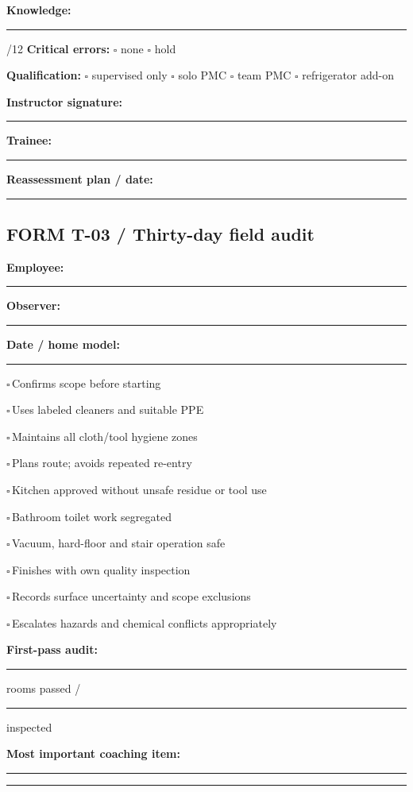 \documentclass[10pt,letterpaper,oneside]{article}
\newcommand{\tick}{\ensuremath{\square}\,}
\newcommand{\task}[1]{\par\noindent\tick #1\par}
\begin{document}
\textbf{Knowledge:} \rule{.7in}{.3pt}/12 \qquad \textbf{Critical errors:} \(\square\) none \(\square\) hold\par
\textbf{Qualification:} \(\square\) supervised only \(\square\) solo PMC \(\square\) team PMC \(\square\) refrigerator add-on\par\vspace{12pt}
\textbf{Instructor signature:} \rule{2.1in}{.3pt} \quad \textbf{Trainee:} \rule{1.5in}{.3pt}
\par\vspace{12pt}\textbf{Reassessment plan / date:}\par\rule{\linewidth}{.3pt}
\newpage\subsection*{FORM T-03 / Thirty-day field audit}
\textbf{Employee:} \rule{2.2in}{.3pt} \quad \textbf{Observer:} \rule{2in}{.3pt}\par
\textbf{Date / home model:} \rule{4.2in}{.3pt}
\begin{plainbox}
\task{Confirms scope before starting}
\task{Uses labeled cleaners and suitable PPE}
\task{Maintains all cloth/tool hygiene zones}
\task{Plans route; avoids repeated re-entry}
\task{Kitchen approved without unsafe residue or tool use}
\task{Bathroom toilet work segregated}
\task{Vacuum, hard-floor and stair operation safe}
\task{Finishes with own quality inspection}
\task{Records surface uncertainty and scope exclusions}
\task{Escalates hazards and chemical conflicts appropriately}
\end{plainbox}
\textbf{First-pass audit:} \rule{.6in}{.3pt} rooms passed / \rule{.6in}{.3pt} inspected\par
\textbf{Most important coaching item:}\par\vspace{16pt}\rule{\linewidth}{.3pt}\par\vspace{12pt}\rule{\linewidth}{.3pt}
\end{document}
